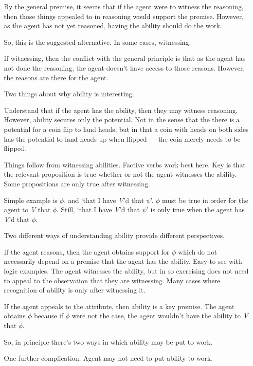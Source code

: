 \documentclass[10pt]{article}
\begin{document}
By the general premise, it seems that if the agent were to witness the reasoning, then those things appealed to in reasoning would support the premise.
However, as the agent has not yet reasoned, having the ability should do the work.

So, this is the suggested alternative.
In some cases, witnessing.

If witnessing, then the conflict with the general principle is that as the agent has not done the reasoning, the agent doesn't have access to those reasons.
However, the reasons are there for the agent.

Two things about why ability is interesting.

Understand that if the agent has the ability, then they may witness reasoning.
However, ability secures only the potential.
Not in the sense that the there is a potential for a coin flip to land heads, but in that a coin with heads on both sides has the potential to land heads up when flipped --- the coin merely needs to be flipped.

Things follow from witnessing abilities.
Factive verbs work best here.
Key is that the relevant proposition is true whether or not the agent witnesses the ability.
Some propositions are only true after witnessing.

Simple example is \(\phi\), and `that I have \emph{V}'d that \(\psi\)'.
\(\phi\) must be true in order for the agent to \emph{V} that \(\phi\).
Still, `that I have \emph{V}'d that \(\psi\)' is only true when the agent has \emph{V}'d that \(\phi\).

Two different ways of understanding ability provide different perspectives.

If the agent reasons, then the agent obtains support for \(\phi\) which do not necessarily depend on a premise that the agent has the ability.
Easy to see with logic examples.
The agent witnesses the ability, but in so exercising does not need to appeal to the observation that they are witnessing.
Many cases where recognition of ability is only after witnessing it.

If the agent appeals to the attribute, then ability is a key premise.
The agent obtains \(\phi\) because if \(\phi\) were not the case, the agent wouldn't have the ability to \emph{V} that \(\phi\).

So, in principle there's two ways in which ability may be put to work.

One further complication.
Agent may not need to put ability to work.
\end{document}
